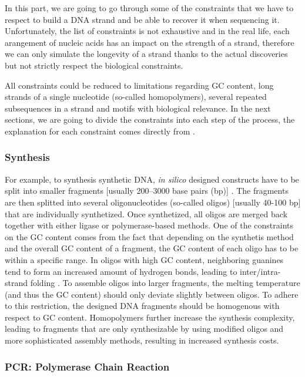 In this part, we are going to go through some of the constraints that we have to respect to build a DNA strand and be able to recover it when sequencing it. Unfortunately, the list of constraints is not exhaustive and in the real life, each arangement of nucleic acids has an impact on the strength of a strand, therefore we can only simulate the longevity of a strand thanks to the actual discoveries but not strictly respect the biological constraints. 

All constraints could be reduced to limitations regarding GC content, long strands of a single nucleotide (so-called homopolymers), several repeated subsequences in a strand and motifs with biological relevance. In the next sections, we are going to divide the constraints into each step of the process, the explanation for each constraint comes directly from \cite{bib:10.1093/bioinformatics/btaa140}.

\subsubsection{Synthesis}

For example, to synthesis synthetic DNA, \textit{in silico} designed constructs have to be split into smaller fragments [usually 200–3000 base pairs (bp)] \cite{bib:101038}. The fragments are then splitted into several oligonucleotides (so-called oligos) [usually 40-100 bp] that are individually synthetized. Once synthetized, all oligos are merged back together with either ligase or polymerase-based methods. One of the constraints on the GC content comes from the fact that depending on the synthetis method and the overall GC content of a fragment,  the GC content of each oligo has to be within a specific range. In oligos with high GC content, neighboring guanines tend to form an increased amount of hydrogen bonds, leading to inter/intra-strand folding \cite{bib:101371}.
To assemble oligos into larger fragments, the melting temperature (and thus the GC content) should only deviate slightly between oligos. To adhere to this restriction, the designed DNA fragments should be homogenous with respect to GC content. Homopolymers further increase the synthesis complexity, leading to fragments that are only synthesizable by using modified oligos and more sophisticated assembly methods, resulting in increased synthesis costs.

\subsubsection{PCR: Polymerase Chain Reaction}

